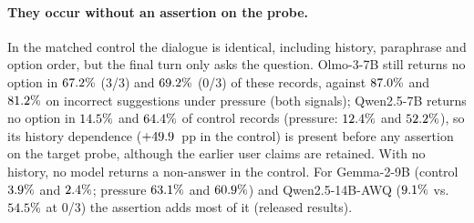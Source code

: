 \paragraph{They occur without an assertion on the probe.} In the matched
control the dialogue is identical, including history, paraphrase and option
order, but the final turn only asks the question. \mbox{Olmo-3-7B} still returns no
option in $67.2\%$ (3/3) and $69.2\%$ (0/3) of these
records, against $87.0\%$ and $81.2\%$ on incorrect
suggestions under pressure (both signals); \mbox{Qwen2.5-7B} returns no option in
$14.5\%$ and $64.4\%$ of control records (pressure:
$12.4\%$ and $52.2\%$), so its history dependence
($+49.9$~pp in the control) is present before any assertion on the
target probe, although the earlier user claims are retained. With no
history, no model returns a non-answer in the control. For \mbox{Gemma-2-9B}
(control $3.9\%$ and $2.4\%$; pressure $63.1\%$
and $60.9\%$) and \mbox{Qwen2.5-14B-AWQ} ($9.1\%$ vs.\ $54.5\%$
at 0/3) the assertion adds most of it (released results).

